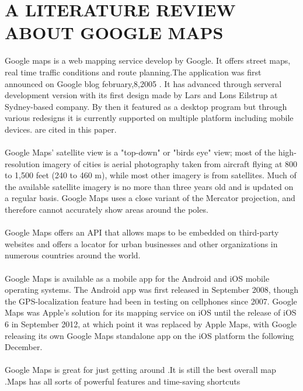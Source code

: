 \documentclass[option]{article}
\begin{document}
\section{A LITERATURE REVIEW ABOUT GOOGLE MAPS}
Google maps is a web mapping service develop by Google. It offers street  maps, real time traffic conditions and route planning.The application was first announced on Google blog february,8,2005 \cite{r1}. It has advanced through serveral development version with its first design made by Lars and Lons Eilstrup at Sydney-based company. By then it featured as a desktop program but through various redesigns it is currently supported on multiple platform including mobile devices.
  are cited in this paper.\\\\
Google Maps' satellite view is a "top-down" or "birds eye" view; most of the high-resolution imagery of cities is aerial photography taken from aircraft flying at 800 to 1,500 feet (240 to 460 m), while most other imagery is from satellites. Much of the available satellite imagery is no more than three years old and is updated on a regular basis. Google Maps uses a close variant of the Mercator projection, and therefore cannot accurately show areas around the poles.\\\\
 Google Maps offers an API that allows maps to be embedded on third-party websites \cite{r2} and offers a locator for urban businesses and other organizations in numerous countries around the world.\\\\
Google Maps is available as a mobile app for the Android and iOS mobile operating systems.
The Android app was first released in September 2008, \cite{r3} though the GPS-localization feature had been in testing on cellphones since 2007. Google Maps was Apple's solution for its mapping service on iOS until the release of iOS 6 in September 2012, at which point it was replaced by Apple Maps, with Google releasing its own Google Maps standalone app on the iOS platform the following December.\\\\
Google Maps is great for just getting around \cite{r4}.It is still the best overall map \cite{r5}.Maps has all sorts of powerful features and time-saving shortcuts


\end{document}
